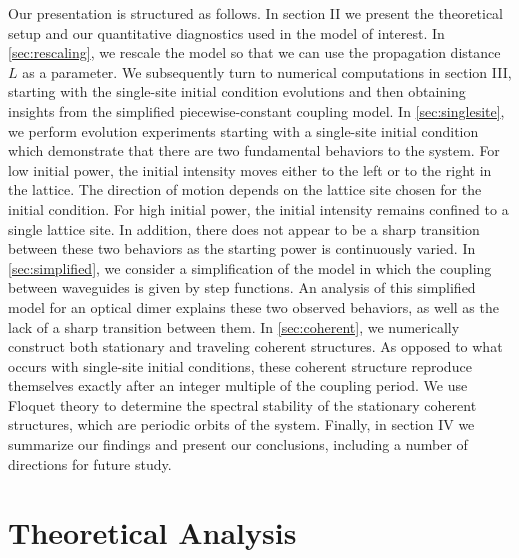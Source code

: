\documentclass[reprint, amsmath,amssymb,aps,pre]{revtex4-2}
\begin{document}
Our presentation is structured as follows. In section II we present
the theoretical setup and our quantitative diagnostics used in the model
of interest. 
In \cref{sec:rescaling}, we rescale the model so that we can use the propagation distance $L$ as a parameter.
We subsequently turn to numerical computations in section III, starting
with the single-site initial condition evolutions and then obtaining
insights from the simplified piecewise-constant coupling model.
In \cref{sec:singlesite}, we perform evolution experiments starting with a single-site initial condition which demonstrate that there are two fundamental behaviors to the system. For low initial power, the initial intensity moves either to the left or to the right in the lattice. The direction of motion depends on the lattice site chosen for the initial condition. For high initial power, the initial intensity remains confined to a single lattice site. In addition, there does not appear to be a sharp transition between these two behaviors as the starting power is continuously varied.
In \cref{sec:simplified}, we consider a simplification of the model in which the coupling between waveguides is given by step functions. An analysis of this simplified model for an optical dimer explains these two observed behaviors, as well as the lack of a sharp transition between them.
In \cref{sec:coherent}, we numerically construct both stationary and traveling coherent structures. As opposed to what occurs with single-site initial conditions, these coherent structure reproduce themselves exactly after an integer multiple of the coupling period. We use Floquet theory to determine the spectral stability of the stationary coherent structures, which are periodic orbits of the system.
Finally, in section IV we
summarize our findings and present our conclusions, including a number
of directions for future study.





\section{Theoretical Analysis}
\end{document}
